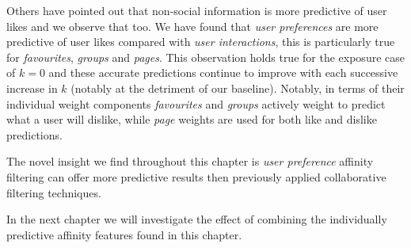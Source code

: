 Others have pointed out that non-social information is more predictive of user likes \cite{www} and we observe that too.
We have found that \emph{user preferences} are more predictive of user likes compared with \emph{user interactions}, this is particularly 
true for \emph{favourites}, \emph{groups} and \emph{pages}. This observation holds true for the exposure case of $k = 0$ and these accurate 
predictions continue to improve with each successive increase in $k$ (notably at the detriment of our baseline). Notably, in terms of their individual weight components
\emph{favourites} and \emph{groups} actively weight to predict what a user will dislike, while \emph{page} weights are used for 
both like and dislike predictions. 

The novel insight we find throughout this chapter is \emph{user preference} affinity filtering can offer more predictive results then 
previously applied collaborative filtering techniques.

In the next chapter we will investigate the effect of combining the individually predictive affinity features found in this chapter.

